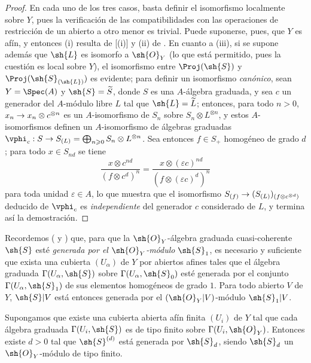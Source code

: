 \documentclass[oneside,10pt]{amsart}
\makeatletter
\renewcommand{\geq}{\geqslant}
\newcommand{\ega@arrow}[2]{\mathchoice{#1}{#2}{#2}{#2}}
\renewcommand{\to}{\ega@arrow{\longrightarrow}{\rightarrow}}
\let\EGAOriginalLabel\label
\renewcommand{\label}[1]{\phantomsection\EGAOriginalLabel{#1}}
\makeatother
\begin{document}
\begin{proof}
En cada uno de los tres casos, basta definir el isomorfismo localmente sobre $Y$, pues la verificación de las compatibilidades con las operaciones de restricción de un abierto a otro menor es trivial.
Puede suponerse, pues, que $Y$ es afín, y entonces (i) resulta de [(i)] y (ii) de .
En cuanto a (iii), si se supone además que $\sh{L}$ es isomorfo a $\sh{O}_Y$ (lo que está permitido, pues la cuestión es local sobre $Y$), el isomorfismo entre $\Proj(\sh{S})$ y $\Proj(\sh{S}_{(\sh{L})})$ es evidente; para definir un isomorfismo \emph{canónico}, sean $Y=\Spec(A)$ y $\sh{S}=\widetilde{S}$, donde $S$ es una $A$-álgebra graduada, y sea $c$ un generador del $A$-módulo libre $L$ tal que $\sh{L}=\widetilde{L}$; entonces, para todo $n>0$, $x_n\to x_n\otimes c^{\otimes n}$ es un $A$-isomorfismo de $S_n$ sobre $S_n\otimes L^{\otimes n}$, y estos $A$-isomorfismos definen un $A$-isomorfismo de álgebras graduadas $\vphi_c:S\to S_{(L)}=\bigoplus_{n\geq0}S_n\otimes L^{\otimes n}$.
Sea entonces $f\in S_+$ homogéneo de grado $d$; para todo $x\in S_{nd}$ se tiene
\[
  \frac{x\otimes c^{nd}}{(f\otimes c^d)^n}
  =
  \frac{x\otimes(\varepsilon c)^{nd}}{(f\otimes(\varepsilon c)^d)^n}
\]
para toda unidad $\varepsilon\in A$, lo que muestra que el isomorfismo $S_{(f)}\to(S_{(L)})_{(f\otimes c^{\otimes d})}$ deducido de $\vphi_c$ es \emph{independiente} del generador $c$ considerado de $L$, y termina así la demostración.
\end{proof}

\begin{env}[3.1.9]
\label{II.3.1.9}
Recordemos ( y ) que, para que la $\sh{O}_Y$-álgebra graduada cuasi-coherente $\sh{S}$ esté \emph{generada por el $\sh{O}_Y$-módulo $\sh{S}_1$}, es necesario y suficiente que exista una cubierta $(U_\alpha)$ de $Y$ por abiertos afines tales que el álgebra graduada $\Gamma(U_\alpha,\sh{S})$ sobre $\Gamma(U_\alpha,\sh{S}_0)$ esté generada por el conjunto $\Gamma(U_\alpha,\sh{S}_1)$ de sus elementos homogéneos de grado $1$.
Para todo abierto $V$ de $Y$, $\sh{S}|V$ está entonces generada por el $(\sh{O}_Y|V)$-módulo $\sh{S}_1|V$.
\end{env}

\begin{proposition}[3.1.10]
\label{II.3.1.10}
Supongamos que existe una cubierta abierta afín finita $(U_i)$ de $Y$ tal que cada álgebra graduada $\Gamma(U_i,\sh{S})$ es de tipo finito sobre $\Gamma(U_i,\sh{O}_Y)$.
Entonces existe $d>0$ tal que $\sh{S}^{(d)}$ está generada por $\sh{S}_d$, siendo $\sh{S}_d$ un $\sh{O}_Y$-módulo de tipo finito.
\end{proposition}
\end{document}
